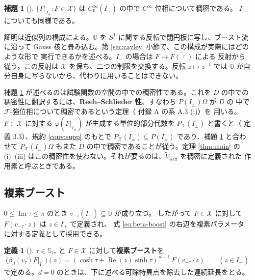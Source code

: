 \documentclass[11pt,a4paper]{article}
\newcommand{\Circ}{S^{1}}
\newcommand{\Fields}{\mathcal{F}}
\newcommand{\Xcl}{\mathcal{X}}
\newcommand{\Oex}{\mathbb{O}}
\newcommand{\Strip}{\mathbb{S}}
\newcommand{\Vt}{\widetilde{V}}
\newcommand{\Dom}{D}
\theoremstyle{definition}
\newtheorem{lemma}[theorem]{補題}
\newtheorem{definition}[theorem]{定義}
\newcommand{\srcnum}[1]{\renewcommand{\thetheorem}{#1}}
\begin{document}
\srcnum{3.4}
\begin{lemma}[\cite{T26}]
\label{lem:34}
$\{F|_{I_+} : F \in \Xcl\}$ は $C_0^\infty(I_+)$ の中で $C^\infty$ 位相について稠密である。
$I_-$ についても同様である。
\end{lemma}

証明は近似列の構成による。$\Oex$ を $\Circ$ に関する反転で閉円板に写し、ブースト流に沿って
Gauss 核と畳み込む。第 \ref{sec:cayley} 小節で、この構成が実際にはどのような形で
実行できるかを述べる。$I_-$ の場合は $F \mapsto \overline{F(\bar{\,\cdot\,})}$ による
反射から従う。この反射は $\Xcl$ を保ち、二つの制限を交換する。反転 $z \mapsto z^{-1}$ では
$\Oex$ が自分自身に写らないから、代わりに用いることはできない。

補題 \ref{lem:34} が述べるのは試験関数の空間の中での稠密性である。これを $\Dom$ の中での
稠密性に翻訳するには、\textbf{Reeh--Schlieder 性}、すなわち $P(I_\pm)\Omega$ が $\Dom$ の
中で $\Fields$-強位相について稠密であるという定理（\cite{CRTT25} 付録 A の系 A.3 (i)）を
用いる。$F \in \Xcl$ に対する $\varphi(F|_{I_\pm})$ が生成する単位的部分代数を
$P_\Xcl(I_\pm)$ と書くと（\cite{T26} 定義 3.3）、規約 \ref{conv:supp} のもとで
$P_\Xcl(I_\pm) \subseteq P(I_\pm)$ であり、補題 \ref{lem:34} と合わせて
$P_\Xcl(I_\pm)\Omega$ もまた $\Dom$ の中で稠密であることが従う。定理 \ref{thm:main} の
(i)--(iii) はこの稠密性を使わない。それが要るのは、$\Vt_{\pm i\pi}$ を稠密に定義された
作用素と呼ぶときである。

\subsection{複素ブースト}

$0 \le \operatorname{Im}\tau \le \pi$ のとき $v_{-\tau}(I_+) \subseteq \Oex$ が成り立つ。
したがって $F \in \Xcl$ に対して $F(v_{-\tau}\cdot z)$ は $z \in I_+$ で定義され、
式 \eqref{eq:beta-boost} の右辺を複素パラメータに対する定義として採用できる。

\srcnum{3.5}
\begin{definition}[\cite{T26}]
\label{def:complexboost}
$\tau \in \Strip_{i\pi}$ と $F \in \Xcl$ に対して\textbf{複素ブースト}を
\begin{equation}
  \label{eq:complex-boost}
  \bigl(\beta_d(v_\tau) F|_{I_+}\bigr)(z)
  = (\cosh\tau + \operatorname{Re}(z)\sinh\tau)^{\,d-1}\, F(v_{-\tau}\cdot z)
  \qquad (z \in I_+)
\end{equation}
で定める。$d = 0$ のときは、下に述べる可除特異点を除去した連続延長をとる。
\end{definition}
\end{document}
